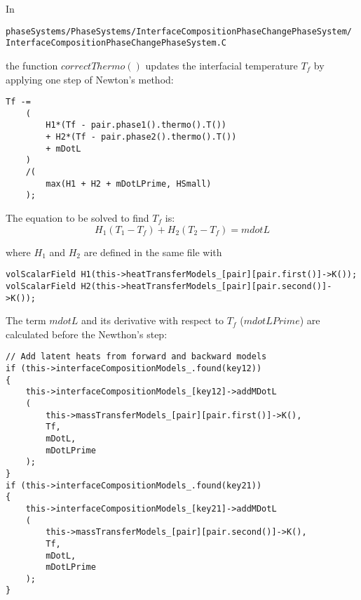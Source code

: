 \documentclass[]{report}
\title{}
\author{}
\begin{document}
\maketitle

\begin{abstract}
\end{abstract}
In 
\begin{verbatim}
phaseSystems/PhaseSystems/InterfaceCompositionPhaseChangePhaseSystem/
InterfaceCompositionPhaseChangePhaseSystem.C 
\end{verbatim}

the function $correctThermo()$ updates the interfacial temperature $T_f$ by applying one step of Newton's method:
\begin{verbatim}
Tf -=
	(
        H1*(Tf - pair.phase1().thermo().T())
        + H2*(Tf - pair.phase2().thermo().T())
        + mDotL
    )
    /(
        max(H1 + H2 + mDotLPrime, HSmall)
    );
\end{verbatim}

The equation to be solved to find $T_f$ is:
\begin{equation}
H_1(T_1-T_f)+H_2(T_2-T_f)= mdotL
\end{equation}

where $H_1$ and $H_2$ are defined in the same file with
\begin{verbatim}
volScalarField H1(this->heatTransferModels_[pair][pair.first()]->K());
volScalarField H2(this->heatTransferModels_[pair][pair.second()]->K());
\end{verbatim}

The term $mdotL$ and its derivative with respect to $T_f$ ($mdotLPrime$) are calculated before the Newthon's step:
\begin{verbatim}
// Add latent heats from forward and backward models
if (this->interfaceCompositionModels_.found(key12))
{
    this->interfaceCompositionModels_[key12]->addMDotL
    (
        this->massTransferModels_[pair][pair.first()]->K(),
        Tf,
        mDotL,
        mDotLPrime
    );
}
if (this->interfaceCompositionModels_.found(key21))
{
    this->interfaceCompositionModels_[key21]->addMDotL
    (
        this->massTransferModels_[pair][pair.second()]->K(),
        Tf,
        mDotL, 
        mDotLPrime
    );
}
\end{verbatim}
\end{document}
